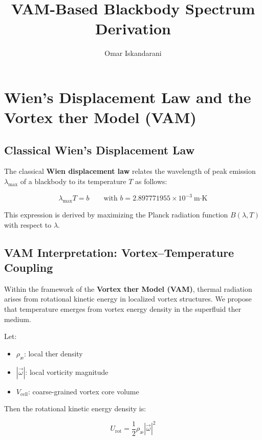 \documentclass[12pt]{article}
\title{\textbf{VAM-Based Blackbody Spectrum Derivation}}
\author{Omar Iskandarani}
\affil{Independent Physics Researcher\\Groningen, The Netherlands}
\date{}
\begin{document}
\maketitle
\section{Wien's Displacement Law and the Vortex \text{\ae}ther Model (VAM)}

\subsection{Classical Wien's Displacement Law}

The classical \textbf{Wien displacement law} relates the wavelength of peak emission \( \lambda_{\text{max}} \) of a blackbody to its temperature \( T \) as follows:

\begin{equation}
\boxed{
\lambda_{\text{max}} T = b
}
\qquad \text{with } b = 2.897771955 \times 10^{-3}~\text{m·K}
\label{eq:wien-law}
\end{equation}

This expression is derived by maximizing the Planck radiation function \( B(\lambda, T) \) with respect to \( \lambda \).

\subsection{VAM Interpretation: Vortex–Temperature Coupling}

Within the framework of the \textbf{Vortex \text{\ae}ther Model (VAM)}, thermal radiation arises from rotational kinetic energy in localized vortex structures. We propose that temperature emerges from vortex energy density in the superfluid \text{\ae}ther medium.

Let:

\begin{itemize}
  \item \( \rho_\text{\ae} \): local \text{\ae}ther density
  \item \( |\vec{\omega}| \): local vorticity magnitude
  \item \( V_{\text{cell}} \): coarse-grained vortex core volume
\end{itemize}

Then the rotational kinetic energy density is:

\begin{equation}
U_{\text{rot}} = \frac{1}{2} \rho_\text{\ae} |\vec{\omega}|^2
\end{equation}
\end{document}
